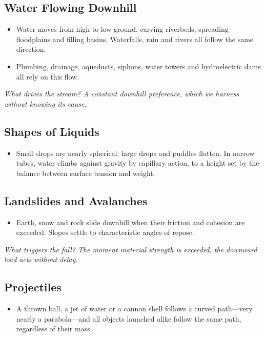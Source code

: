 \documentclass[11pt,a4paper]{article}
\newcommand{\why}[1]{\par\textit{#1}\par}
\begin{document}
\subsection{Water Flowing Downhill}

\begin{itemize}
  \item Water moves from high to low ground, carving riverbeds, spreading floodplains and filling basins. Waterfalls, rain and rivers all follow the same direction.
  \item Plumbing, drainage, aqueducts, siphons, water towers and hydroelectric dams all rely on this flow.
\end{itemize}

\why{What drives the stream? A constant downhill preference, which we harness without knowing its cause.}

\subsection{Shapes of Liquids}

\begin{itemize}
  \item Small drops are nearly spherical; large drops and puddles flatten. In narrow tubes, water climbs against gravity by capillary action, to a height set by the balance between surface tension and weight.
\end{itemize}

\subsection{Landslides and Avalanches}

\begin{itemize}
  \item Earth, snow and rock slide downhill when their friction and cohesion are exceeded. Slopes settle to characteristic angles of repose.
\end{itemize}

\why{What triggers the fall? The moment material strength is exceeded, the downward load acts without delay.}

\subsection{Projectiles}

\begin{itemize}
  \item A thrown ball, a jet of water or a cannon shell follows a curved path---very nearly a parabola---and all objects launched alike follow the same path, regardless of their mass.
\end{itemize}
\end{document}
